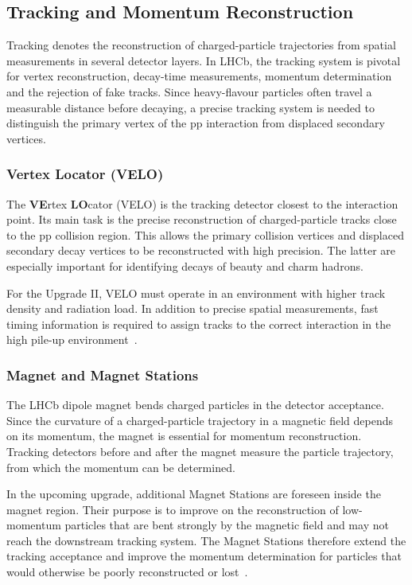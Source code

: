 \subsection{Tracking and Momentum Reconstruction}
Tracking denotes the reconstruction of charged-particle trajectories from spatial measurements in several detector layers. In LHCb, the tracking system is pivotal for vertex reconstruction, decay-time measurements, momentum determination and the rejection of fake tracks. Since heavy-flavour particles often travel a measurable distance before decaying, a precise tracking system is needed to distinguish the primary vertex of the pp interaction from displaced secondary vertices.
%
\subsubsection{Vertex Locator (VELO)}
The \textbf{VE}rtex \textbf{LO}cator (VELO) is the tracking detector closest to the interaction point. Its main task is the precise reconstruction of charged-particle tracks close to the pp collision region. This allows the primary collision vertices and displaced secondary decay vertices to be reconstructed with high precision. The latter are especially important for identifying decays of beauty and charm hadrons.\par
For the Upgrade II, VELO must operate in an environment with higher track density and radiation load. In addition to precise spatial measurements, fast timing information is required to assign tracks to the correct interaction in the high pile-up environment~\cite{Schmitz2026-je, CERN-LHCC-2021-012}.
%
\subsubsection{Magnet and Magnet Stations}
The LHCb dipole magnet bends charged particles in the detector acceptance. Since the curvature of a charged-particle trajectory in a magnetic field depends on its momentum, the magnet is essential for momentum reconstruction. Tracking detectors before and after the magnet measure the particle trajectory, from which the momentum can be determined.\par
In the upcoming upgrade, additional Magnet Stations are foreseen inside the magnet region. Their purpose is to improve on the reconstruction of low-momentum particles that are bent strongly by the magnetic field and may not reach the downstream tracking system. The Magnet Stations therefore extend the tracking acceptance and improve the momentum determination for particles that would otherwise be poorly reconstructed or lost~\cite{CERN-LHCC-2021-012}.
%
